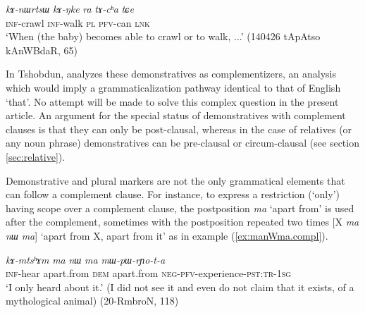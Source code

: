 \documentclass[oneside,a4paper,11pt]{article}
\newcommand{\ipa}[1]{\textit{\phon#1}}
\begin{document}
 \begin{exe}
\ex \label{ex:kANke.ra}
\gll   \ipa{kɤ-nɯrtsɯ} 	\ipa{kɤ-ŋke} 	\ipa{ra} 	\ipa{tɤ-cʰa} 	\ipa{tɕe}   \\
  \textsc{inf}-crawl   \textsc{inf}-walk \textsc{pl} \textsc{pfv}-can \textsc{lnk} \\
\glt `When (the baby) becomes able to crawl or to walk, ...'  (140426 tApAtso kAnWBdaR, 65)
\end{exe}

In Tshobdun, \citet[481]{sun12complementation} analyzes these demonstratives as complementizers, an analysis which would imply a grammaticalization pathway identical to that of English `that'. No attempt will be made to solve this complex question in the present article. An argument for the special status of demonstratives with complement clauses is that they can only be post-clausal, whereas in the case of relatives (or any noun phrase) demonstratives can be pre-clausal or circum-clausal (see section \ref{sec:relative}).

Demonstrative and plural markers are not the only grammatical elements that can follow a complement clause. For instance, to express a restriction (`only') having scope over a complement clause, the postposition \ipa{ma} `apart from' is used after the complement, sometimes with the postposition repeated two times [X \ipa{ma} \ipa{nɯ} \ipa{ma}] `apart from X, apart from it' as in example (\ref{ex:manWma.compl}).

\begin{exe}
\ex \label{ex:manWma.compl}
\gll \ipa{kɤ-mtsʰɤm} 	\ipa{ma} 	\ipa{nɯ} 	\ipa{ma} 	\ipa{mɯ-pɯ-rɲo-t-a} \\
\textsc{inf}-hear apart.from \textsc{dem} apart.from \textsc{neg-pfv}-experience-\textsc{pst:tr-1sg} \\
\glt `I only heard about it.' (I did not see it and even do not claim that it exists, of a mythological animal) (20-RmbroN, 118)
\end{exe}
\end{document}
